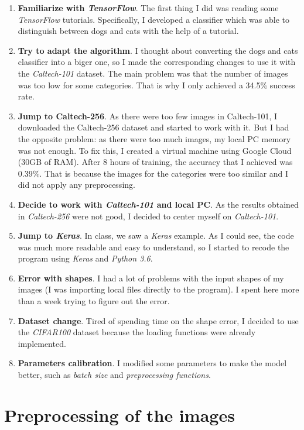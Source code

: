 \documentclass[12pt,english]{article}
\begin{document}
\begin{enumerate}
	\item \textbf{Familiarize with \emph{TensorFlow}}. The first thing I did was reading some \emph{TensorFlow} tutorials. Specifically, I developed a classifier which was able to distinguish between dogs and cats with the help of a tutorial. 
	\item \textbf{Try to adapt the algorithm}. I thought about converting the dogs and cats classifier into a biger one, so I made the corresponding changes to use it with the \emph{Caltech-101} dataset. The main problem was that the number of images was too low for some categories. That is why I only achieved a 34.5\% success rate.
	\item \textbf{Jump to Caltech-256}. As there were too few images in Caltech-101, I downloaded the Caltech-256 dataset and started to work with it. But I had the opposite problem: as there were too much images, my local PC memory was not enough. To fix this, I created a virtual machine using Google Cloud (30GB of RAM). After 8 hours of training, the accuracy that I achieved was  0.39\%. That is because the images for the categories were too similar and I did not apply any preprocessing.
	\item \textbf{Decide to work with \emph{Caltech-101} and local PC}. As the results obtained in \emph{Caltech-256} were not good, I decided to center myself on \emph{Caltech-101}.
	\item \textbf{Jump to \emph{Keras}}. In class, we saw a \emph{Keras} example. As I could see, the code was much more readable and easy to understand, so I started to recode the program using \emph{Keras} and \emph{Python 3.6}.
	\item \textbf{Error with shapes}. I had a lot of problems with the input shapes of my images (I was importing local files directly to the program). I spent here more than a week trying to figure out the error. 
	\item \textbf{Dataset change}. Tired of spending time on the shape error, I decided to use the \emph{CIFAR100} dataset because the loading functions were already implemented.
	\item \textbf{Parameters calibration}. I modified some parameters to make the model better, such as \emph{batch size} and \emph{preprocessing functions}.
\end{enumerate}

\section{Preprocessing of the images}
\end{document}
